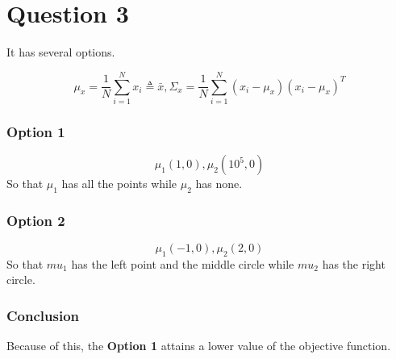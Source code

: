 \documentclass[12pt,letterpaper]{article}
\begin{document}
\section*{Question 3}

It has several options.

\begin{equation}
	\mu_x=\frac1N\sum^N_{i=1}x_i\triangleq\bar{x},\Sigma_x=\frac1N\sum^N_{i=1}(x_i-\mu_x)(x_i-\mu_x)^T
\end{equation}

\subsubsection*{Option 1}
\begin{equation}
	\mu_1(1,0),\mu_2(10^5,0)
\end{equation}
So that $\mu_1$ has all the points while $\mu_2$ has none.

\subsubsection*{Option 2}
\begin{equation}
	\mu_1(-1,0),\mu_2(2,0)
\end{equation}
So that $mu_1$ has the left point and the middle circle while $mu_2$ has the right circle.

\subsubsection*{Conclusion}
Because of this, the \textbf{Option 1} attains a lower value of the objective function.
\end{document}
